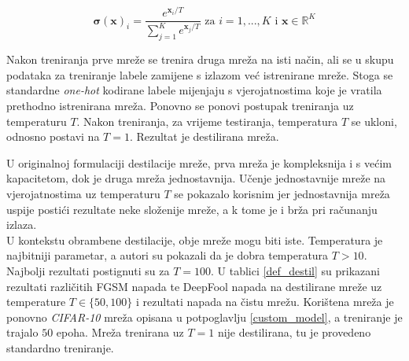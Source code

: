 \documentclass[utf8, diplomski]{fer}
\begin{document}
\begin{equation}\label{softmax_t}
	\boldsymbol{\sigma}(\boldsymbol{x})_{i} = \frac{e^{\boldsymbol{x}_{i} / T}}{\sum_{j=1}^{K}e^{\boldsymbol{x}_{j} / T}} \text{ za } i = 1, ..., K \text{ i } \boldsymbol{x} \in \mathbb{R}^{K}
\end{equation}

Nakon treniranja prve mreže se trenira druga mreža na isti način, ali se u skupu podataka za treniranje labele zamijene s izlazom već istrenirane mreže. Stoga se standardne \textit{one-hot} kodirane labele mijenjaju s vjerojatnostima koje je vratila prethodno istrenirana mreža. Ponovno se ponovi postupak treniranja uz temperaturu $T$. Nakon treniranja, za vrijeme testiranja, temperatura $T$ se ukloni, odnosno postavi na $T = 1$. Rezultat je destilirana mreža. \par
U originalnoj formulaciji destilacije mreže, prva mreža je kompleksnija i s većim kapacitetom, dok je druga mreža jednostavnija. Učenje jednostavnije mreže na vjerojatnostima uz temperaturu $T$ se pokazalo korisnim jer jednostavnija mreža uspije postići rezultate neke složenije mreže, a k tome je i brža pri računanju izlaza. \\
U kontekstu obrambene destilacije, obje mreže mogu biti iste. Temperatura je najbitniji parametar, a autori su pokazali da je dobra temperatura $T > 10$. Najbolji rezultati postignuti su za $T = 100$. U tablici \ref{def_destil} su prikazani rezultati različitih FGSM napada te DeepFool napada na destilirane mreže uz temperature $T \in \{50, 100\}$ i rezultati napada na čistu mrežu. Korištena mreža je ponovno \textit{CIFAR-10} mreža opisana u potpoglavlju \ref{custom_model}, a treniranje je trajalo $50$ epoha. Mreža trenirana uz $T = 1$ nije destilirana, tu je provedeno standardno treniranje.
\end{document}
